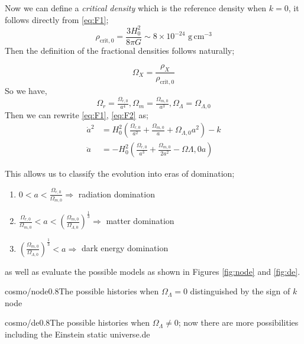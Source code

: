 \paraskip
Now we can define a \emph{critical density} which is the reference density when $k = 0$, it follows directly from \eqref{eq:F1};
\begin{equation}
\rho_{\text{crit},0} = \frac{3H_0^2}{8\pi G} \sim 8 \times 10^{-24} \,\, \text{g}\,\text{cm}^{-3}
\end{equation}
Then the definition of the fractional densities follows naturally;
\begin{examplebox}
\begin{equation}
\Omega_X = \frac{\rho_X}{\rho_{\text{crit},0}}
\end{equation}
So we have,
\begin{equation}
\Omega_r = \tfrac{\Omega_{r,0}}{a^4}, \Omega_m = \tfrac{\Omega_{m,0}}{a^3}, \Omega_{\Lambda} = \Omega_{\Lambda,0}
\end{equation}
Then we can rewrite \eqref{eq:F1}, \eqref{eq:F2} as;
\begin{align}
\dot{a}^2 &= H_0^2 \left(\frac{\Omega_{r,0}}{a^2} + \frac{\Omega_{m,0}}{a} + \Omega_{\Lambda, 0}a^2 \right) - k \\
\ddot{a} &= - H_0^2 \left(\frac{\Omega_{r,0}}{a^3} + \frac{\Omega_{m,0}}{2a^2} - \Omega{\Lambda, 0}a \right)
\end{align}
\end{examplebox}
This allows us to classify the evolution into eras of domination;
\begin{enumerate}
\item $0 < a < \tfrac{\Omega_{r,0}}{\Omega_{m,0}} \Rightarrow$ radiation domination
\item $\tfrac{\Omega_{r,0}}{\Omega_{m,0}} < a < \left(\tfrac{\Omega_{m,0}}{\Omega_{\Lambda,0}}\right)^{\tfrac{1}{3}} \Rightarrow$ matter domination
\item $\left(\tfrac{\Omega_{m,0}}{\Omega_{\Lambda,0}}\right)^{\tfrac{1}{3}} < a \Rightarrow$ dark energy domination
\end{enumerate}
as well as evaluate the possible models as shown in Figures \ref{fig:node} and \ref{fig:de}.
\begin{mygraphic}{cosmo/node}{0.8}{The possible histories when $\Omega_{\Lambda} = 0$ distinguished by the sign of $k$}{node}\end{mygraphic}
\begin{mygraphic}{cosmo/de}{0.8}{The possible histories when $\Omega_{\Lambda} \neq 0$; now there are more possibilities including the Einstein static universe.}{de}\end{mygraphic}
